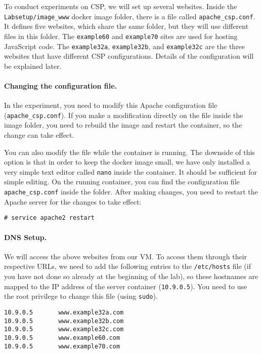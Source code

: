 To conduct experiments on CSP, we will set up several websites. 
Inside the \texttt{Labsetup/image\_www} docker image folder, 
there is a file called \texttt{apache\_csp.conf}.
It defines five websites, which share the same folder, but
they will use different files in this folder. 
The \texttt{example60} and \texttt{example70} sites are 
used for hosting JavaScript code.  The 
\texttt{example32a}, \texttt{example32b}, and 
\texttt{example32c} are the three websites that 
have different CSP configurations. Details of the configuration 
will be explained later.


\paragraph{Changing the configuration file.}
In the experiment, you need to modify this Apache 
configuration file (\texttt{apache\_csp.conf}). If you make a modification
directly on the file inside the image folder, you need to rebuild the image
and restart the container, so the change can take effect. 

You can also modify the file while the container is running. 
The downside of this 
option is that in order to keep the docker image small, 
we have only installed a very simple text editor called \texttt{nano} 
inside the container. It should be sufficient for simple editing.   
On the running container, you can find the configuration
file \texttt{apache\_csp.conf} inside the 
 folder.  
After making changes, you need to restart the Apache server for the 
changes to take effect:

\begin{lstlisting}
# service apache2 restart
\end{lstlisting}


\paragraph{DNS Setup.}
We will access the above websites from our VM. 
To access them through their respective URLs, 
we need to add the following entries to the 
\texttt{/etc/hosts} file (if you have not done so already
at the beginning of the lab), so these hostnames are mapped to 
the IP address of the server container (\texttt{10.9.0.5}). 
You need to use the root privilege to 
change this file (using \texttt{sudo}).

\begin{lstlisting}
10.9.0.5       www.example32a.com
10.9.0.5       www.example32b.com
10.9.0.5       www.example32c.com
10.9.0.5       www.example60.com
10.9.0.5       www.example70.com
\end{lstlisting}


